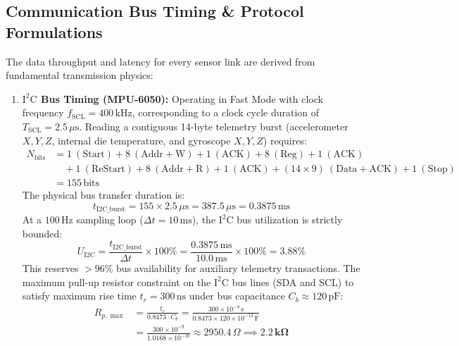 \documentclass[11pt, a4paper]{article}
\begin{document}
\subsection{Communication Bus Timing \& Protocol Formulations}
The data throughput and latency for every sensor link are derived from fundamental transmission physics:
\begin{enumerate}
    \item \textbf{$\text{I}^2\text{C}$ Bus Timing (MPU-6050):} Operating in Fast Mode with clock frequency $f_{\text{SCL}} = 400\,\text{kHz}$, corresponding to a clock cycle duration of $T_{\text{SCL}} = 2.5\,\mu\text{s}$. Reading a contiguous 14-byte telemetry burst (accelerometer $X,Y,Z$, internal die temperature, and gyroscope $X,Y,Z$) requires:
    \begin{align}
        N_{\text{bits}} &= 1\ (\text{Start}) + 8\ (\text{Addr}+\text{W}) + 1\ (\text{ACK}) + 8\ (\text{Reg}) + 1\ (\text{ACK}) \nonumber \\
        &\quad + 1\ (\text{ReStart}) + 8\ (\text{Addr}+\text{R}) + 1\ (\text{ACK}) + (14 \times 9)\ (\text{Data}+\text{ACK}) + 1\ (\text{Stop}) \nonumber \\
        &= 155\,\text{bits}
    \end{align}
    The physical bus transfer duration is:
    \begin{equation}
        t_{\text{I2C\_burst}} = 155 \times 2.5\,\mu\text{s} = 387.5\,\mu\text{s} = 0.3875\,\text{ms}
    \end{equation}
    At a $100\,\text{Hz}$ sampling loop ($\Delta t = 10\,\text{ms}$), the $\text{I}^2\text{C}$ bus utilization is strictly bounded:
    \begin{equation}
        U_{\text{I2C}} = \frac{t_{\text{I2C\_burst}}}{\Delta t} \times 100\% = \frac{0.3875\,\text{ms}}{10.0\,\text{ms}} \times 100\% = 3.88\%
    \end{equation}
    This reserves $>96\%$ bus availability for auxiliary telemetry transactions. The maximum pull-up resistor constraint on the $\text{I}^2\text{C}$ bus lines (SDA and SCL) to satisfy maximum rise time $t_r = 300\,\text{ns}$ under bus capacitance $C_b \approx 120\,\text{pF}$:
    \begin{align}
        R_{p, \max} &= \frac{t_r}{0.8473 \cdot C_b} = \frac{300 \times 10^{-9}\,\text{s}}{0.8473 \times 120 \times 10^{-12}\,\text{F}} \nonumber \\
        &= \frac{300 \times 10^{-9}}{1.0168 \times 10^{-10}} \approx 2950.4\,\Omega \implies \mathbf{2.2\,\text{k}\Omega}

\end{align}
\end{enumerate}
\end{document}
